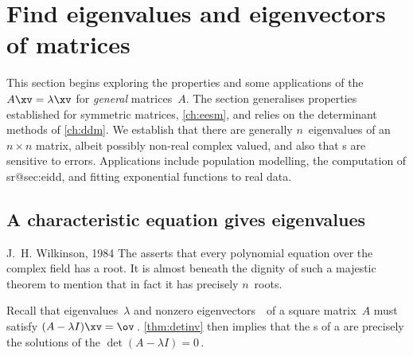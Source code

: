 

\section{Find eigenvalues and eigenvectors of matrices}
\label{sec:eennm}

\secttoc

This section begins exploring the properties and some applications of the  \(A\xv=\lambda\xv\) for \emph{general} matrices~\(A\).
The section generalises properties established for symmetric matrices, \cref{ch:eesm}, and relies on the determinant methods of \cref{ch:ddm}.
We establish that there are generally \(n\)~eigenvalues of an \(n\times n\) matrix, albeit possibly non-real complex valued, and also that s are sensitive to errors.
Applications include population modelling,  
the computation of \svd{}s\ifcsname r@sec:eidd\endcsname, and 
fitting exponential functions to real data\fi.




\subsection{A characteristic equation gives eigenvalues}
\label{sec:cege}

\begin{quoted}{J.~H. Wilkinson, 1984 \cite[p.103]{Higham1996}}
The  asserts that every polynomial equation over the complex field has a root.  
It is almost beneath the dignity of such a majestic theorem to mention that in fact it has precisely \(n\)~roots.
\end{quoted}


Recall that eigenvalues~\(\lambda\) and nonzero eigenvectors~\xv\ of a square matrix~\(A\) must satisfy \((A-\lambda I)\xv=\ov\)\,.
\cref{thm:detinv} then implies that the s of a  are precisely the solutions of the  \(\det(A-\lambda I)=0\)\,.  


